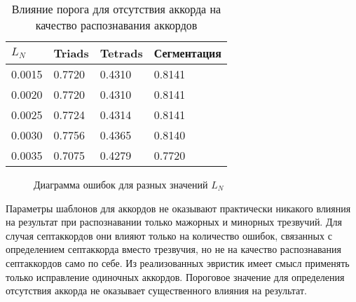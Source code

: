 \begin{table} [htbp]
  \centering
  \parbox{15cm}{\caption{Влияние порога для отсутствия аккорда на
  качество распознавания аккордов} \label{TLN}}
  \begin{tabular}{|l|l|l|l|}
  \hline
  $L_N$ & Triads & Tetrads & Сегментация \\
  \hline
  0.0015 & 0.7720 & 0.4310 & 0.8141 \\
  0.0020 & 0.7720 & 0.4310 & 0.8141 \\
  0.0025 & 0.7724 & 0.4314 & 0.8141 \\
  0.0030 & 0.7756 & 0.4365 & 0.8140 \\
  0.0035 & 0.7075 & 0.4279 & 0.7720 \\
  \hline
  \end{tabular}
\end{table}

\begin{figure}[h]
  \begin{minipage}[h]{0.49\linewidth}
  \end{minipage}
  \hfill
  \begin{minipage}[h]{0.49\linewidth}
  \end{minipage}
  \caption{Диаграмма ошибок для разных значений $L_N$}
  \label{img:noChordness}
\end{figure}


\medskip

Параметры шаблонов для аккордов не оказывают практически никакого влияния на
результат при распознавании только мажорных и минорных трезвучий. Для случая
септаккордов они влияют только на количество ошибок, связанных с определением
септаккорда вместо трезвучия, но не на качество распознавания септаккордов само
по себе. Из реализованных эвристик имеет смысл применять только исправление
одиночных аккордов. Пороговое значение для определения отсутствия аккорда не
оказывает существенного влияния на результат.


